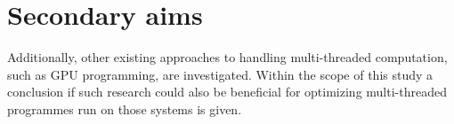 \section{Secondary aims}

Additionally, other existing approaches to handling multi-threaded computation, such as GPU programming, are investigated. Within the scope of this study a conclusion if such research could also be beneficial for optimizing multi-threaded programmes run on those systems is given.

